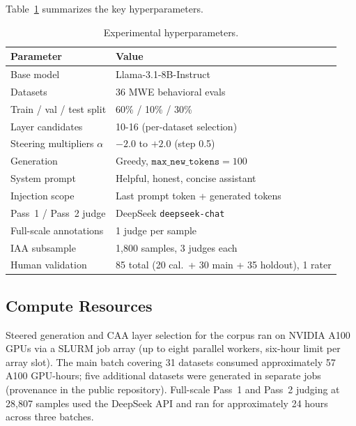 Table~\ref{tab:experimental_params} summarizes the key hyperparameters.

\begin{table}[htbp]
  \centering\small
  \caption{Experimental hyperparameters.}
  \label{tab:experimental_params}
  \begin{tabular}{@{}ll@{}}
    \toprule
    Parameter & Value \\
    \midrule
    Base model & Llama-3.1-8B-Instruct \\
    Datasets & 36 MWE behavioral evals \\
    Train / val / test split & 60\% / 10\% / 30\% \\
    Layer candidates & 10-16 (per-dataset selection) \\
    Steering multipliers $\alpha$ & $-2.0$ to $+2.0$ (step 0.5) \\
    Generation & Greedy, $\texttt{max\_new\_tokens}=100$ \\
    System prompt & Helpful, honest, concise assistant \\
    Injection scope & Last prompt token + generated tokens \\
    Pass~1 / Pass~2 judge & DeepSeek \texttt{deepseek-chat} \\
    Full-scale annotations & 1 judge per sample \\
    IAA subsample & 1{,}800 samples, 3 judges each \\
    Human validation & 85 total (20 cal.\ + 30 main + 35 holdout), 1 rater \\
    \bottomrule
  \end{tabular}
\end{table}

\subsection{Compute Resources}
Steered generation and CAA layer selection for the corpus ran on NVIDIA A100 GPUs via a SLURM job array (up to eight parallel workers, six-hour limit per array slot).
The main batch covering 31 datasets consumed approximately 57 A100 GPU-hours; five additional datasets were generated in separate jobs (provenance in the public repository).
Full-scale Pass~1 and Pass~2 judging at 28{,}807 samples used the DeepSeek API and ran for approximately 24 hours across three batches.
